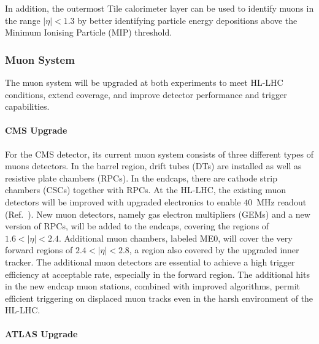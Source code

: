 In addition, the outermost Tile calorimeter layer can be used to identify muons in
the range $|\eta| < 1.3$ by better identifying particle energy depositions above the Minimum
Ionising Particle (MIP) threshold.


\subsubsection{Muon System} \label{sec:upgrademuon}

The muon system will be upgraded at both experiments to meet HL-LHC conditions, extend coverage, and improve detector performance and trigger capabilities. 

\paragraph{CMS Upgrade} 
For the CMS detector, its current muon system consists of three different types of muons detectors. In the barrel region, drift tubes (DTs) are installed as well as resistive plate chambers (RPCs). In the endcaps, there are cathode strip chambers (CSCs) together with RPCs. 
At the HL-LHC, the existing muon detectors will be improved with upgraded electronics to enable $40$~MHz readout (Ref.~\cite{Lourenco:2283189}). 
New muon detectors, namely gas electron multipliers (GEMs) and a new version of RPCs, will be added to the endcaps, covering the regions of $1.6<|\eta|<2.4$. 
Additional muon chambers, labeled ME0, will cover the very forward regions of $2.4<|\eta|<2.8$, a region also covered by the upgraded inner tracker. 
The additional muon detectors are essential to achieve a high trigger efficiency at acceptable rate, especially in the forward region.
The additional hits in the new endcap muon stations, combined with improved algorithms, permit efficient triggering on displaced muon tracks even in the harsh environment of the HL-LHC. 

\paragraph{ATLAS Upgrade}

